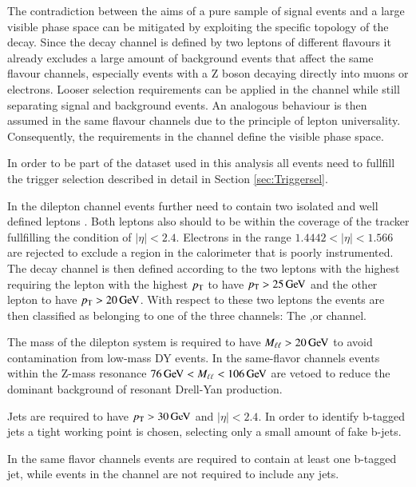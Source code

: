 The contradiction between the aims of a pure sample of signal events and a large visible phase space can be mitigated by exploiting the specific topology of the \ttbar decay. 
Since the \emu decay channel is defined by two leptons of different flavours it already excludes a large amount of background events that affect the same flavour channels, especially
events with a Z boson decaying directly into muons or electrons.  
Looser selection requirements can be applied in the \emu channel while still separating signal and background events. An analogous behaviour is then assumed in the same flavour channels due to the
principle of lepton universality. Consequently, the requirements in the \emu channel define the visible phase space.

In order to be part of the dataset used in this analysis all events need to fullfill the trigger selection described in detail in Section \ref{sec:Triggersel}.

In the dilepton channel events further need to contain two isolated and well defined leptons .
Both leptons also should to be within the coverage of the tracker fullfilling the condition of $|\eta| < 2.4$.
Electrons in the range $1.4442<|\eta|<1.566$ are rejected to exclude a region in the calorimeter that is poorly instrumented.
The decay channel is then defined according to the two leptons with the highest \pt requiring the lepton with the highest $p_{\mathrm{T}}$ to have $p_{\mathrm{T}} > 25 \,\text{Ge\hspace{-.08em}V}$
and the other lepton to have $p_{\mathrm{T}} > 20 \,\text{Ge\hspace{-.08em}V}$. 
With respect to these two leptons the events are then classified as belonging to one of the three channels: The \mumu,\ee or \mumu channel.

The mass of the dilepton system is required to have $M_{\ell\ell} > 20 \,\text{Ge\hspace{-.08em}V}$ to avoid contamination from low-mass DY events.
In the same-flavor channels events within the Z-mass resonance $76 \,\text{Ge\hspace{-.08em}V} < M_{\ell\ell} <106 \,\text{Ge\hspace{-.08em}V}$ are vetoed to reduce the dominant background of 
resonant Drell-Yan production.

Jets are required to have $p_{\mathrm{T}} > 30 \,\text{Ge\hspace{-.08em}V}$ and $|\eta|<2.4$. In order to identify b-tagged jets a tight working point is chosen, selecting only a small amount of fake b-jets.

In the same flavor channels events are required to contain at least one b-tagged jet, while events in the \emu channel are not required to include any jets.

